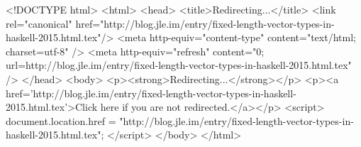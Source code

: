 <!DOCTYPE html>
<html>
<head>
<title>Redirecting...</title>
<link rel="canonical" href="http://blog.jle.im/entry/fixed-length-vector-types-in-haskell-2015.html.tex"/>
<meta http-equiv="content-type" content="text/html; charset=utf-8" />
<meta http-equiv="refresh" content="0; url=http://blog.jle.im/entry/fixed-length-vector-types-in-haskell-2015.html.tex" />
</head>
<body>
  <p><strong>Redirecting...</strong></p>
  <p><a href='http://blog.jle.im/entry/fixed-length-vector-types-in-haskell-2015.html.tex'>Click here if you are not redirected.</a></p>
  <script>
    document.location.href = "http://blog.jle.im/entry/fixed-length-vector-types-in-haskell-2015.html.tex";
  </script>
</body>
</html>
